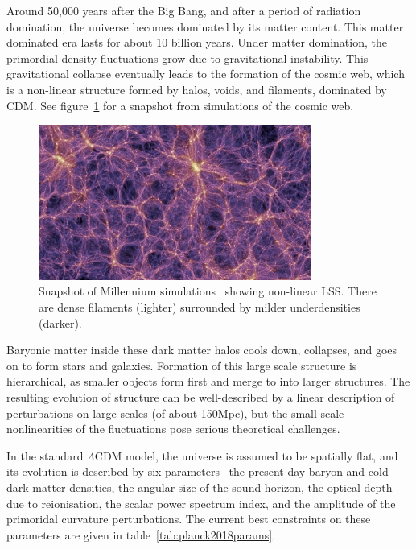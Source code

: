 Around 50,000 years after the Big Bang, and after a period of radiation domination, the universe becomes dominated by its matter content. This matter dominated era lasts for about 10 billion years. Under matter domination, the primordial density fluctuations grow due to gravitational instability. This gravitational collapse eventually leads to the formation of the cosmic web, which is a non-linear structure formed by halos, voids, and filaments, dominated by CDM. See figure~\ref{fig:millennium} for a snapshot from simulations of the cosmic web. 

\begin{figure}[ht!]
	\centering
	\includegraphics[width=0.8\textwidth]{fig/Millennium.png}
	\caption{Snapshot of Millennium simulations~\cite{Springel:2005nw} showing non-linear LSS. There are dense filaments (lighter) surrounded by milder underdensities (darker). }
	\label{fig:millennium}
\end{figure}

Baryonic matter inside these dark matter halos cools down, collapses, and goes on to form stars and galaxies. Formation of this large scale structure is hierarchical, as smaller objects form first and merge to into larger structures. The resulting evolution of structure can be well-described by a linear description of perturbations on large scales (of about 150Mpc), but the small-scale nonlinearities of the fluctuations pose serious theoretical challenges.

In the standard $\Lambda$CDM model, the universe is assumed to be spatially flat, and its evolution is described by six parameters-- the present-day baryon and cold dark matter densities, the angular size of the sound horizon, the optical depth due to reionisation, the scalar power spectrum index, and the amplitude of the primoridal curvature perturbations. The current best constraints on these parameters are given in table~\ref{tab:planck2018params}.

